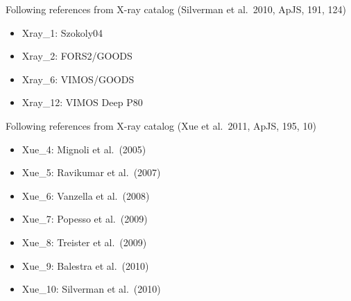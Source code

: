 \documentclass[12pt,onecolumn]{article}
\begin{document}
\noindent Following references from X-ray catalog (Silverman et al.\ 2010, ApJS, 191, 124)
\begin{itemize}
\item Xray\_1: Szokoly04
\item Xray\_2: FORS2/GOODS
\item Xray\_6: VIMOS/GOODS
\item Xray\_12: VIMOS Deep P80
\end{itemize}

\noindent Following references from X-ray catalog (Xue et al.\ 2011, ApJS, 195, 10)
\begin{itemize}
\item Xue\_4: Mignoli et al.\ (2005)
\item Xue\_5: Ravikumar et al.\ (2007)
\item Xue\_6: Vanzella et al.\ (2008)
\item Xue\_7: Popesso et al.\ (2009)
\item Xue\_8: Treister et al.\ (2009)
\item Xue\_9: Balestra et al.\ (2010)
\item Xue\_10: Silverman et al.\ (2010)
\end{itemize}
\end{document}

